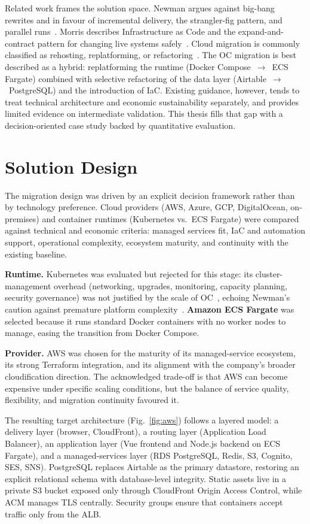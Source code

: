 \documentclass[conference]{IEEEtran}
\begin{document}
Related work frames the solution space. Newman argues against big-bang
rewrites and in favour of incremental delivery, the strangler-fig pattern,
and parallel runs~\cite{newman2021building}. Morris describes Infrastructure
as Code and the expand-and-contract pattern for changing live systems
safely~\cite{morris2021iac}. Cloud migration is commonly classified as
rehosting, replatforming, or refactoring~\cite{awsCloudMigrationOverview}.
The OC migration is best described as a hybrid: replatforming the runtime
(Docker Compose~$\rightarrow$~ECS Fargate) combined with selective
refactoring of the data layer (Airtable~$\rightarrow$~PostgreSQL) and the
introduction of IaC. Existing guidance, however, tends to treat technical
architecture and economic sustainability separately, and provides limited
evidence on intermediate validation. This thesis fills that gap with a
decision-oriented case study backed by quantitative evaluation.

\section{Solution Design}
The migration design was driven by an explicit decision framework rather
than by technology preference. Cloud providers (AWS, Azure, GCP,
DigitalOcean, on-premises) and container runtimes (Kubernetes vs.\ ECS
Fargate) were compared against technical and economic criteria: managed
services fit, IaC and automation support, operational complexity, ecosystem
maturity, and continuity with the existing baseline.

\textbf{Runtime.} Kubernetes was evaluated but rejected for this stage:
its cluster-management overhead (networking, upgrades, monitoring, capacity
planning, security governance) was not justified by the scale of
OC~\cite{kubernetesOverview}, echoing Newman's caution against premature
platform complexity~\cite{newman2021building}. \textbf{Amazon ECS Fargate}
was selected because it runs standard Docker containers with no worker
nodes to manage, easing the transition from Docker Compose.

\textbf{Provider.} AWS was chosen for the maturity of its managed-service
ecosystem, its strong Terraform integration, and its alignment with the
company's broader cloudification direction. The acknowledged trade-off is
that AWS can become expensive under specific scaling conditions, but the
balance of service quality, flexibility, and migration continuity favoured
it.

The resulting target architecture (Fig.~\ref{fig:aws}) follows a layered
model: a delivery layer (browser, CloudFront), a routing layer (Application
Load Balancer), an application layer (Vue frontend and Node.js backend on
ECS Fargate), and a managed-services layer (RDS PostgreSQL, Redis, S3,
Cognito, SES, SNS). PostgreSQL replaces Airtable as the primary datastore,
restoring an explicit relational schema with database-level integrity.
Static assets live in a private S3 bucket exposed only through CloudFront
Origin Access Control, while ACM manages TLS centrally. Security groups
ensure that containers accept traffic only from the ALB.
\end{document}
